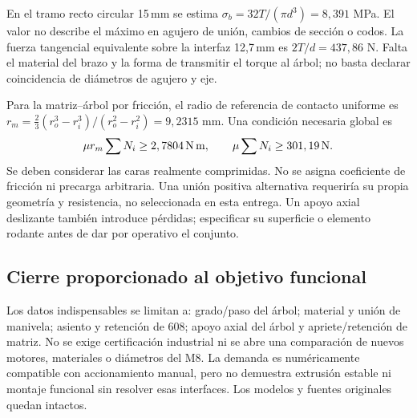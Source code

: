 En el tramo recto circular 15\,mm se estima
$\sigma_b=32T/(\pi d^3)=8,391$ MPa. El valor no describe el máximo en
agujero de unión, cambios de sección o codos. La fuerza tangencial
equivalente sobre la interfaz 12,7\,mm es $2T/d=437,86$ N. Falta el material
del brazo y la forma de transmitir el torque al árbol; no basta declarar
coincidencia de diámetros de agujero y eje.

Para la matriz--árbol por fricción, el radio de referencia de contacto
uniforme es $r_m=\frac23(r_o^3-r_i^3)/(r_o^2-r_i^2)=9,2315$ mm.
Una condición necesaria global es
\begin{equation}
 \mu r_m\sum N_i\geq 2,7804\,{\rm N\,m},\qquad
 \mu\sum N_i\geq 301,19\,{\rm N}.
\end{equation}
Se deben considerar las caras realmente comprimidas. No se asigna
coeficiente de fricción ni precarga arbitraria. Una unión positiva
alternativa requeriría su propia geometría y resistencia, no seleccionada
en esta entrega. Un apoyo axial deslizante también introduce pérdidas;
especificar su superficie o elemento rodante antes de dar por operativo
el conjunto.

\subsection{Cierre proporcionado al objetivo funcional}
Los datos indispensables se limitan a: grado/paso del árbol; material y
unión de manivela; asiento y retención de 608; apoyo axial del árbol y
apriete/retención de matriz. No se exige certificación industrial ni se
abre una comparación de nuevos motores, materiales o diámetros del M8.
La demanda es numéricamente compatible con accionamiento manual, pero no
demuestra extrusión estable ni montaje funcional sin resolver esas
interfaces. Los modelos y fuentes originales quedan intactos.
